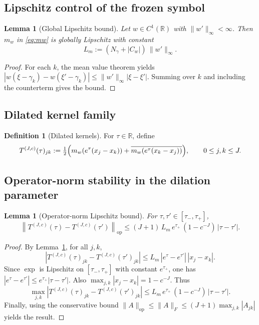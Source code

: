 \documentclass[12pt,reqno]{amsart}
\numberwithin{equation}{section}
\newtheorem{lemma}[theorem]{Lemma}
\theoremstyle{definition}
\newtheorem{definition}[theorem]{Definition}
\theoremstyle{remark}
\newcommand{\RR}{\mathbb{R}}
\newcommand{\opnorm}[1]{\left\|#1\right\|_{\mathrm{op}}}
\begin{document}
\subsection{Lipschitz control of the frozen symbol}
\begin{lemma}[Global Lipschitz bound]
\label{lem:lipschitz}
Let $w\in C^1(\RR)$ with $\|w'\|_\infty<\infty$. Then $m_w$ in \eqref{eq:mw} is globally
Lipschitz with constant
\[
L_m := (N_\gamma+|C_w|)\,\|w'\|_\infty.
\]
\end{lemma}

\begin{proof}
For each $k$, the mean value theorem yields
$|w(\xi-\gamma_k)-w(\xi'-\gamma_k)|\le \|w'\|_\infty|\xi-\xi'|$.
Summing over $k$ and including the counterterm gives the bound.
\end{proof}

\subsection{Dilated kernel family}
\begin{definition}[Dilated kernels]
\label{def:dilated}
For $\tau\in\RR$, define
\[
T^{(J,c)}(\tau)_{jk}
:=
\tfrac12\Bigl(
m_w(e^\tau(x_j-x_k))
+
\overline{m_w(e^\tau(x_k-x_j))}
\Bigr),
\qquad 0\le j,k\le J.
\]
\end{definition}

\subsection{Operator-norm stability in the dilation parameter}
\begin{lemma}[Operator-norm Lipschitz bound]
\label{lem:tau_lipschitz}
For $\tau,\tau'\in[\tau_-,\tau_+]$,
\[
\opnorm{T^{(J,c)}(\tau)-T^{(J,c)}(\tau')}
\le
(J+1)\,L_m\,e^{\tau_+}\,(1-c^{-J})\,|\tau-\tau'|.
\]
\end{lemma}

\begin{proof}
By Lemma~\ref{lem:lipschitz}, for all $j,k$,
\[
|T^{(J,c)}(\tau)_{jk}-T^{(J,c)}(\tau')_{jk}|
\le
L_m\,|e^\tau-e^{\tau'}|\,|x_j-x_k|.
\]
Since $\exp$ is Lipschitz on $[\tau_-,\tau_+]$ with constant $e^{\tau_+}$, one has
$|e^\tau-e^{\tau'}|\le e^{\tau_+}|\tau-\tau'|$. Also $\max_{j,k}|x_j-x_k|=1-c^{-J}$.
Thus
\[
\max_{j,k}|T^{(J,c)}(\tau)_{jk}-T^{(J,c)}(\tau')_{jk}|
\le
L_m\,e^{\tau_+}\,(1-c^{-J})\,|\tau-\tau'|.
\]
Finally, using the conservative bound
$\|A\|_{\mathrm{op}}\le\|A\|_F\le(J+1)\max_{j,k}|A_{jk}|$ yields the result.
\end{proof}
\end{document}
